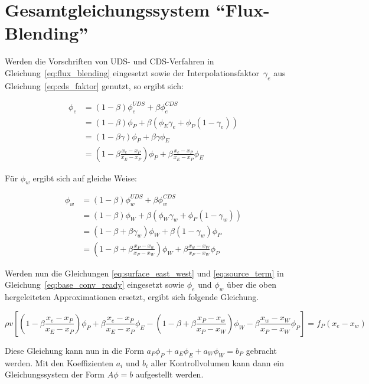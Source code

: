 \documentclass[10pt, ngerman,colorback,accentcolor=tud2d]{tudreport}
\begin{document}
\section{Gesamtgleichungssystem ``Flux-Blending''}

Werden die Vorschriften von UDS- und CDS-Verfahren in Gleichung~\eqref{eq:flux_blending}
eingesetzt sowie der Interpolationsfaktor~$\gamma_e$ aus Gleichung~\eqref{eq:cds_faktor} genutzt, so ergibt sich:

\begin{align}
  \phi_e &= (1-\beta)\phi_e^{UDS} + \beta \phi_e^{CDS} \nonumber\\
         &= (1-\beta)\phi_P + \beta \left({\phi_E\gamma_e + \phi_P (1-\gamma_e)}\right) \nonumber\\
         &= (1-\beta \gamma) \phi_P + \beta \gamma \phi_E\\
         &= \left({1-\beta \frac{x_e-x_P}{x_E-x_P}}\right) \phi_P + \beta \frac{x_e-x_P}{x_E-x_P} \phi_E
\end{align}

Für $\phi_w$ ergibt sich auf gleiche Weise:

\begin{align}
  \phi_w &= (1-\beta)\phi_w^{UDS} + \beta \phi_w^{CDS} \nonumber\\
         &= (1-\beta)\phi_W + \beta \left({\phi_W \gamma_w + \phi_P (1-\gamma_w)}\right) \nonumber\\
         &= (1-\beta +\beta \gamma_w)\phi_W + \beta (1-\gamma_w)\phi_P\\
         &= \left({1-\beta + \beta \frac{x_P-x_w}{x_P-x_W}}\right) \phi_W + \beta \frac{x_w-x_W}{x_P-x_W} \phi_P
\end{align}

Werden nun die Gleichungen \eqref{eq:surface_east_west} und \eqref{eq:source_term}
in Gleichung~\eqref{eq:base_conv_ready} eingesetzt sowie $\phi_e$ und $\phi_w$ über
die oben hergeleiteten Approximationen ersetzt, ergibt sich folgende Gleichung.

\begin{equation*}
  \rho v \left[{
    \left({1-\beta \frac{x_e-x_P}{x_E-x_P}}\right) \phi_P + \beta \frac{x_e-x_P}{x_E-x_P} \phi_E
    -\left({1-\beta + \beta \frac{x_P-x_w}{x_P-x_W}}\right) \phi_W - \beta \frac{x_w-x_W}{x_P-x_W} \phi_P
  }\right]
  = f_P(x_e-x_w)
\end{equation*}

Diese Gleichung kann nun in die Form $a_P \phi_P + a_E \phi_E + a_W \phi_W = b_P$
gebracht werden. Mit den Koeffizienten $a_i$ und $b_i$ aller Kontrollvolumen kann
dann ein Gleichungssystem der Form $A\phi = b$ aufgestellt werden.
\end{document}
